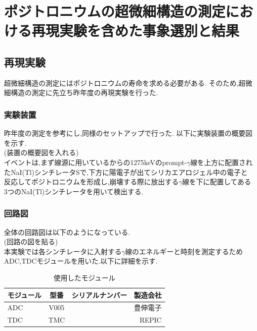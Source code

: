 \chapter{ポジトロニウムの超微細構造の測定における再現実験を含めた事象選別と結果}\label{result}

\section{再現実験}
超微細構造の測定にはポジトロニウムの寿命を求める必要がある.
そのため,超微細構造の測定に先立ち昨年度の再現実験を行った.

\subsection{実験装置}
昨年度の測定を参考にし,同様のセットアップで行った.
以下に実験装置の概要図を示す.\\
(装置の概要図を入れる)\\

イベントは,まず線源に用いているからの1275keVのprompt-$\gamma$線を上方に配置されたNaI(Tl)シンチレータSで,下方に陽電子が出てシリカエアロジェル中の電子と反応してポジトロニウムを形成し,崩壊する際に放出する$\gamma$線を下に配置してある3つのNaI(Tl)シンチレータを用いて検出する.

\subsection{回路図}
全体の回路図は以下のようになっている.\\
(回路の図を貼る)\\

本実験では各シンチレータに入射する$\gamma$線のエネルギーと時刻を測定するためADC,TDCモジュールを用いた.以下に詳細を示す.
\begin{table}[htbp]
	\begin{center}
		\caption{使用したモジュール}
		\begin{tabular}{|l|c|r|r|} \hline
			モジュール & 型番 & シリアルナンバー & 製造会社 \\ \hline \hline
			ADC & V005 & & 豊伸電子 \\ \hline
			TDC & TMC & & REPIC \\ \hline
		\end{tabular}
		\label{module}
	\end{center}
\end{table}

